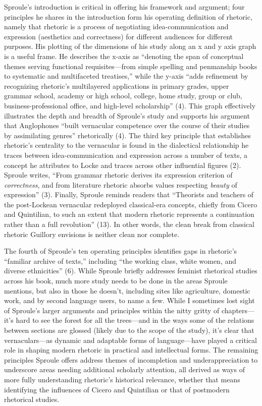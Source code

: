 \documentclass{tufte-handout}
\begin{document}
Sproule's introduction is critical in offering his framework and
argument; four principles he shares in the introduction form his
operating definition of rhetoric, namely that rhetoric is a process of
negotiating idea-communication and expression (aesthetics and
correctness) for different audiences for different purposes. His
plotting of the dimensions of his study along an x and y axis graph is a
useful frame. He describes the x-axis as ``denoting the span of
conceptual themes serving functional requisites---from simple spelling
and penmanship books to systematic and multifaceted treatises,'' while
the y-axis ``adds refinement by recognizing rhetoric's multilayered
applications in primary grades, upper grammar school, academy or high
school, college, home study, group or club, business-professional
office, and high-level scholarship'' (4). This graph effectively
illustrates the depth and breadth of Sproule's study and supports his
argument that Anglophones ``built vernacular competence over the course
of their studies by assimilating genres'' rhetorically (4). The third
key principle that establishes rhetoric's centrality to the vernacular
is found in the dialectical relationship he traces between
idea-communication and expression across a number of texts, a concept he
attributes to Locke and traces across other influential figures (2).
Sproule writes, ``From grammar rhetoric derives its expression criterion
of \emph{correctness}, and from literature rhetoric absorbs values
respecting \emph{beauty} of expression'' (3). Finally, Sproule reminds
readers that ``Theorists and teachers of the post-Lockean vernacular
redeployed classical-era concepts, chiefly from Cicero and Quintilian,
to such an extent that modern rhetoric represents a continuation rather
than a full revolution'' (13). In other words, the clean break from
classical rhetoric Guillory envisions is neither clean nor complete.

The fourth of Sproule's ten operating principles identifies gaps in
rhetoric's ``familiar archive of texts,'' including ``the working class,
white women, and diverse ethnicities'' (6). While Sproule briefly
addresses feminist rhetorical studies across his book, much more study
needs to be done in the areas Sproule mentions, but also in those he
doesn't, including sites like agriculture, domestic work, and by second
language users, to name a few. While I sometimes lost sight of Sproule's
larger arguments and principles within the nitty gritty of
chapters---it's hard to see the forest for all the trees---and in the
ways some of the relations between sections are glossed (likely due
to the scope of the study), it's clear that vernaculars---as dynamic and
adaptable forms of language---have played a critical role in shaping
modern rhetoric in practical and intellectual forms. The remaining
principles Sproule offers address themes of incompletion and
underappreciation to underscore areas needing additional scholarly
attention, all derived as ways of more fully understanding rhetoric's
historical relevance, whether that means identifying the influences of
Cicero and Quintilian or that of postmodern rhetorical studies.
\end{document}
